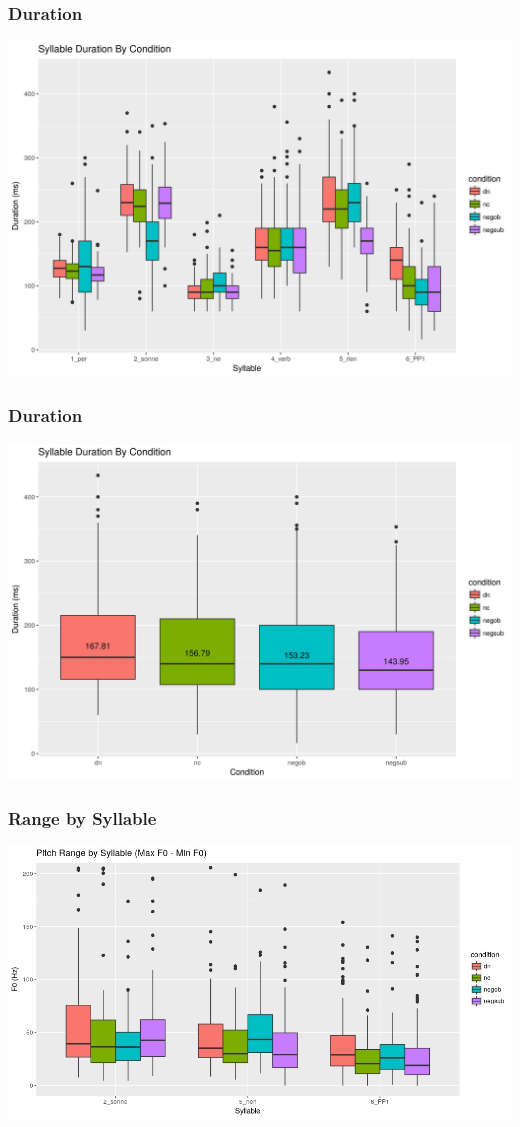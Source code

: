 \documentclass{beamer}
\begin{document}
\begin{frame}
\frametitle{Duration}
\begin{center}
\includegraphics[width=\linewidth]{figures/overall_dur.jpeg}
\end{center}
\end{frame}

\begin{frame}
\frametitle{Duration}
\includegraphics[width=\linewidth]{figures/dur_cond.jpeg} 
\end{frame}

\begin{frame}
\frametitle{Range by Syllable}
\begin{center}
\includegraphics[width=\linewidth]{figures/pitch_range.jpeg}
\end{center}
\end{frame}
\end{document}
